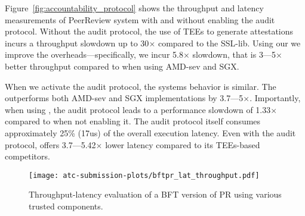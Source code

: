 
 Figure~\ref{fig:accountability_protocol} shows the throughput and latency measurements of PeerReview system with and without enabling the audit protocol.
Without the audit protocol, the use of TEEs to generate attestations incurs a throughput slowdown up to 30$\times$ compared to the SSL-lib. Using our \projecttitle{} we improve the overheads---specifically, we incur 5.8$\times$ slowdown, that is 3---5$\times$ better throughput compared to when using AMD-sev and SGX.


When we activate the audit protocol, the systems behavior is similar. The \projecttitle{} outperforms both AMD-sev and SGX implementations by 3.7---5$\times$. Importantly, when using \projecttitle{}, the audit protocol leads to a performance slowdown of 1.33$\times$ compared to when not enabling it. The audit protocol itself consumes approximately 25\% (17us) of the overall execution latency. Even with the audit protocol, \projecttitle{} offers 3.7---5.42$\times$ lower latency compared to its TEEs-based competitors.



\begin{figure}[t!]
    \centering
    \texttt{[image: atc-submission-plots/bftpr\_lat\_throughput.pdf]} 
    \caption{Throughput-latency evaluation of a BFT version of PR using various trusted components.} \label{fig:lat_throughput_kernel}
\end{figure}
\fi
